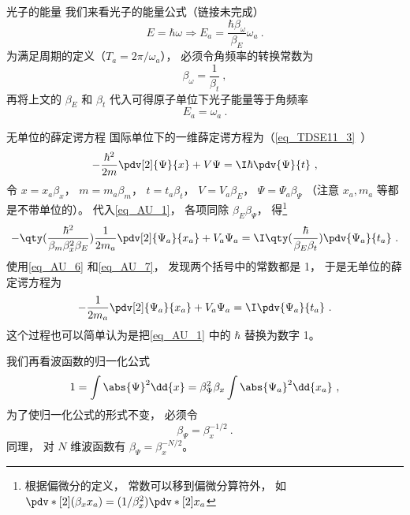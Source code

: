 \begin{example}{光子的能量}
我们来看光子的能量公式（链接未完成）
\begin{equation}
E = \hbar \omega \Longrightarrow E_a = \frac{\hbar\beta_\omega}{\beta_E}\omega_a~.
\end{equation}
为满足周期的定义（$T_a = 2\pi/\omega_a$）， 必须令角频率的转换常数为
\begin{equation}
\beta_\omega = \frac{1}{\beta_t}~,
\end{equation}
再将上文的 $\beta_E$ 和 $\beta_t$ 代入可得原子单位下光子能量等于角频率
\begin{equation}\label{eq_AU_2}
E_a = \omega_a~.
\end{equation}
\end{example}

\begin{example}{无单位的薛定谔方程}\label{ex_AU_1}
国际单位下的一维薛定谔方程为（\autoref{eq_TDSE11_3}~）
\begin{equation}\label{eq_AU_1}
-\frac{\hbar^2}{2m} \pdv[2]{\Psi}{x} + V\Psi= \I\hbar \pdv{\Psi}{t}~,
\end{equation}
令 $x = x_a\beta_x$， $m = m_a\beta_m$， $t = t_a\beta_t$， $V = V_a\beta_E$， $\Psi = \Psi_a \beta_\Psi$ （注意 $x_a, m_a$ 等都是不带单位的）。
代入\autoref{eq_AU_1}， 各项同除 $\beta_E\beta_\Psi$， 得\footnote{根据偏微分的定义， 常数可以移到偏微分算符外， 如 $\pdv*[2]{(\beta_x x_a)} = (1/\beta_x^2) \pdv*[2]{x_a}$}
\begin{equation}\label{eq_AU_3}
-\qty(\frac{\hbar^2}{\beta_m\beta_x^2\beta_E})\frac{1}{2m_a} \pdv[2]{\Psi_a}{x_a} + V_a\Psi_a= \I\qty(\frac{\hbar}{\beta_E\beta_t})\pdv{\Psi_a}{t_a}~.
\end{equation}
使用\autoref{eq_AU_6} 和\autoref{eq_AU_7}， 发现两个括号中的常数都是 1， 于是无单位的薛定谔方程为
\begin{equation}\label{eq_AU_4}
-\frac{1}{2m_a} \pdv[2]{\Psi_a}{x_a} + V_a\Psi_a= \I\pdv{\Psi_a}{t_a}~.
\end{equation}
这个过程也可以简单认为是把\autoref{eq_AU_1} 中的 $\hbar$ 替换为数字 1。

我们再看波函数的归一化公式
\begin{equation}
1 = \int \abs{\Psi}^2 \dd{x} = \beta_\Psi^2 \beta_x \int \abs{\Psi_a}^2 \dd{x_a}~,
\end{equation}
为了使归一化公式的形式不变， 必须令
\begin{equation}\label{eq_AU_5}
\beta_\Psi = \beta_x^{-1/2}~.
\end{equation}
同理， 对 $N$ 维波函数有 $\beta_\Psi = \beta_x^{-N/2}$。
\end{example}

